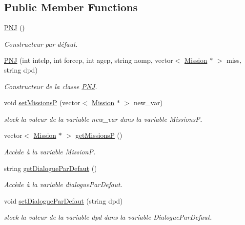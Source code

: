 \subsection*{Public Member Functions}
\begin{DoxyCompactItemize}
\item 
\hyperlink{class_p_n_j_af47e047679a553304cd94c4f052afc9d}{P\-N\-J} ()
\begin{DoxyCompactList}\small\item\em Constructeur par défaut. \end{DoxyCompactList}\item 
\hyperlink{class_p_n_j_a9d69e66223cac489b73561e71e0949e4}{P\-N\-J} (int intelp, int forcep, int agep, string nomp, vector$<$ \hyperlink{class_mission}{Mission} $\ast$ $>$ miss, string dpd)
\begin{DoxyCompactList}\small\item\em Constructeur de la classe \hyperlink{class_p_n_j}{P\-N\-J}. \end{DoxyCompactList}\item 
void \hyperlink{class_p_n_j_a519fb3ba5b692d2088c7c3a66421f72b}{set\-Missions\-P} (vector$<$ \hyperlink{class_mission}{Mission} $\ast$ $>$ new\-\_\-var)
\begin{DoxyCompactList}\small\item\em stock la valeur de la variable new\-\_\-var dans la variable Missions\-P. \end{DoxyCompactList}\item 
vector$<$ \hyperlink{class_mission}{Mission} $\ast$ $>$ \hyperlink{class_p_n_j_ab947fafa6afecf6640e1279ff05b7941}{get\-Missions\-P} ()
\begin{DoxyCompactList}\small\item\em Accède à la variable Mission\-P. \end{DoxyCompactList}\item 
string \hyperlink{class_p_n_j_ac2495e0c6580568cd6299389df128b20}{get\-Dialogue\-Par\-Defaut} ()
\begin{DoxyCompactList}\small\item\em Accède à la variable dialogue\-Par\-Defaut. \end{DoxyCompactList}\item 
void \hyperlink{class_p_n_j_ae938be01cfe4befe3a86c512cb2f87e1}{set\-Dialogue\-Par\-Defaut} (string dpd)
\begin{DoxyCompactList}\small\item\em stock la valeur de la variable dpd dans la variable Dialogue\-Par\-Defaut. \end{DoxyCompactList}\item 

\end{DoxyCompactItemize}
